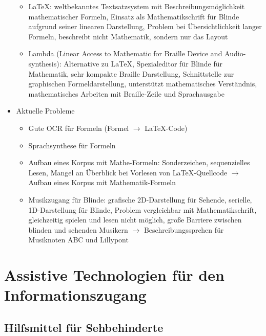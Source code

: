 \documentclass[paper=a4, fontsize=11pt]{scrartcl} %
\numberwithin{equation}{section} %
\numberwithin{figure}{section} %
\numberwithin{table}{section} %
\begin{document}
\begin{itemize}
\begin{itemize}
\item LaTeX: weltbekanntes Textsatzsystem mit Beschreibungsmöglichkeit mathematischer Formeln, Einsatz als Mathematikschrift für Blinde aufgrund seiner linearen Darstellung, Problem bei Übersichtlichkeit langer Formeln, beschreibt nicht Mathematik, sondern nur das Layout
\item Lambda (Linear Access to Mathematic for Braille Device and Audio-synthesis): Alternative zu LaTeX, Spezialeditor für Blinde für Mathematik, sehr kompakte Braille Darstellung, Schnittstelle zur graphischen Formeldarstellung, unterstützt mathematisches Verständnis, mathematisches Arbeiten mit Braille-Zeile und Sprachausgabe
\end{itemize}
\item Aktuelle Probleme
\begin{itemize}
\item Gute OCR für Formeln (Formel $\rightarrow$ LaTeX-Code)
\item Sprachsynthese für Formeln
\item Aufbau eines Korpus mit Mathe-Formeln: Sonderzeichen, sequenzielles Lesen, Mangel an Überblick bei Vorlesen von LaTeX-Quellcode $\rightarrow$ Aufbau eines Korpus mit Mathematik-Formeln
\item Musikzugang für Blinde: grafische 2D-Darstellung für Sehende, serielle, 1D-Darstellung für Blinde, Problem vergleichbar mit Mathematikschrift, gleichzeitig spielen und lesen nicht möglich, große Barriere zwischen blinden und sehenden Musikern $\rightarrow$ Beschreibungssprchen für Musiknoten ABC und Lillypont
\end{itemize}
\end{itemize}
\newpage
\section{Assistive Technologien für den Informationszugang}

\subsection{Hilfsmittel für Sehbehinderte}
\end{document}

